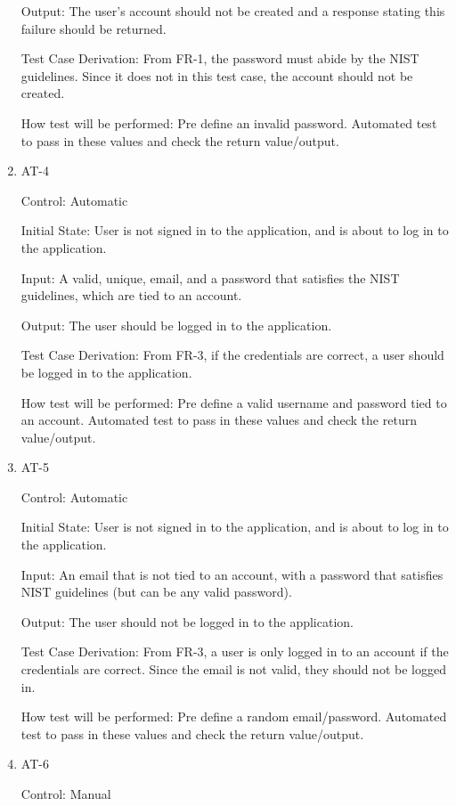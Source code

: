 \documentclass[12pt, titlepage]{article}
\begin{document}
\begin{enumerate}
Output: The user's account should not be created and a response stating this failure should be returned.

Test Case Derivation: From FR-1, the password must abide by the NIST guidelines. Since it does not in this test case, the account should not 
be created.

How test will be performed: Pre define an invalid password. Automated test to pass in these values and check the return value/output.


\item{AT-4\\}

Control: Automatic
					
Initial State: User is not signed in to the application, and is about to log in to the application.
					
Input: A valid, unique, email, and a password that satisfies the NIST guidelines, which are tied to an account.
					
Output: The user should be logged in to the application.

Test Case Derivation: From FR-3, if the credentials are correct, a user should be logged in to the application.

How test will be performed: Pre define a valid username and password tied to an account. Automated test to pass in these values and check the return value/output.


\item{AT-5\\}

Control: Automatic
					
Initial State: User is not signed in to the application, and is about to log in to the application.
					
Input: An email that is not tied to an account, with a password that satisfies NIST guidelines (but can be any valid password).
					
Output: The user should not be logged in to the application.

Test Case Derivation: From FR-3, a user is only logged in to an account if the credentials are correct. Since the email is not valid,
they should not be logged in.

How test will be performed: Pre define a random email/password. Automated test to pass in these values and check the return value/output.

\item{AT-6}

Control: Manual
					

\end{enumerate}
\end{document}
